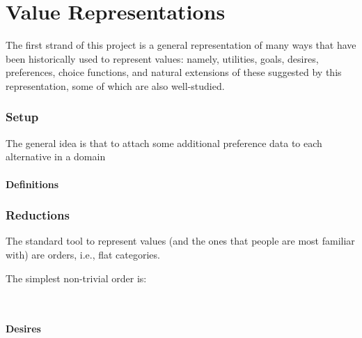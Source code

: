\documentclass{article}
\begin{document}
	\part{Value Representations}
	
	The first strand of this project is a general representation of many ways that have been historically used to represent values: namely, utilities, goals, desires, preferences, choice functions, and natural extensions of these suggested by this representation, some of which are also well-studied. 
	
	\section{Setup}
	
	
	The general idea is that to attach some additional preference data to each alternative in a domain
	
	\subsection{Definitions}
	

	
	\section{Reductions}
	
	The standard tool to represent values (and the ones that people are most familiar with) are orders, i.e., flat categories. 
	
	The simplest non-trivial order is:
	\begin{center}
		\raisebox{0.7em}{$\mathbb B = $}~
	\end{center}
	
	\subsection{Desires}
	
\end{document}
